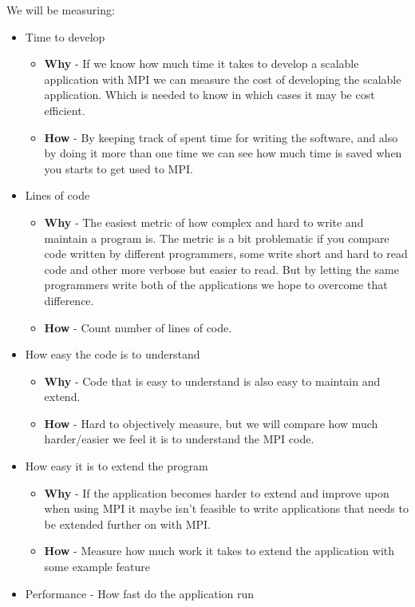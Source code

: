 \documentclass{article}
\begin{document}
{We will be measuring:
\begin{itemize}
\item Time to develop
\begin{itemize}
\item{ \textbf{Why} - If we know how much time it takes to develop a scalable application with
MPI we can measure the cost of developing the scalable application. Which is needed to
know in which cases it may be cost efficient.}
\item{ \textbf{How} - By keeping track of spent time for writing the software, 
and also by doing it more than one time we can see how much time is saved
when you starts to get used to MPI.}
\end{itemize}
\item Lines of code
\begin{itemize}
\item{ \textbf{Why} - The easiest metric of how complex and hard to write and
 maintain a program is. The metric is a bit problematic if you compare
 code written by different programmers, some write short and hard to read
 code and other more verbose but easier to read. But by letting the same
 programmers write both of the applications we hope to overcome that 
 difference.}
\item{ \textbf{How} - Count number of lines of code.}
\end{itemize}
\item How easy the code is to understand
\begin{itemize}
\item{ \textbf{Why} - Code that is easy to understand is also easy to maintain and extend. }
\item{ \textbf{How} - Hard to objectively measure, but we will compare how much harder/easier we 
 feel it is to understand the MPI code. }
\end{itemize}
\item How easy it is to extend the program
\begin{itemize}
\item{ \textbf{Why} - If the application becomes harder to extend and improve upon 
when using MPI it maybe isn't feasible to write applications that
needs to be extended further on with MPI.}
\item{ \textbf{How} - Measure how much work it takes to extend the application with 
		some example feature}
\end{itemize}
\item Performance - How fast do the application run

\end{itemize}}
\end{document}
